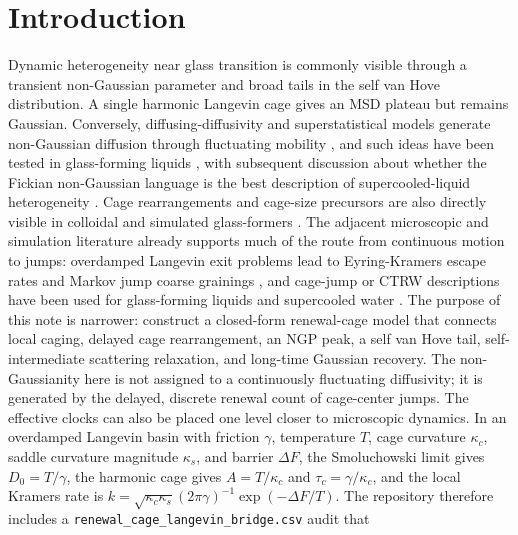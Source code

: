 \documentclass[aps,preprint,onecolumn,superscriptaddress,nofootinbib]{revtex4-2}
\begin{document}
\maketitle

\section{Introduction}

Dynamic heterogeneity near glass transition is commonly visible through a
transient non-Gaussian parameter and broad tails in the self van Hove
distribution. A single harmonic Langevin cage gives an MSD plateau but remains
Gaussian. Conversely, diffusing-diffusivity and superstatistical models
generate non-Gaussian diffusion through fluctuating mobility
\cite{chubynsky2014diffusing,chechkin2017brownian,guan2014fickian}, and such
ideas have been tested in glass-forming liquids \cite{rusciano2022fickian},
with subsequent discussion about whether the Fickian non-Gaussian language is
the best description of supercooled-liquid heterogeneity
\cite{berthier2023comment,rusciano2022reply}. Cage rearrangements and
cage-size precursors are also directly visible in colloidal and simulated
glass-formers \cite{weeks2002cage,pastore2017cage}. The adjacent microscopic
and simulation literature already supports much of the route from continuous
motion to jumps: overdamped Langevin exit problems lead to Eyring-Kramers
escape rates and Markov jump coarse grainings \cite{lelievre2022eyring}, and
cage-jump or CTRW descriptions have been used for glass-forming liquids
\cite{pastore2016cagejump,pastore2017cage} and supercooled water
\cite{kikutsuji2019water}. The purpose of this note is narrower: construct a
closed-form renewal-cage model that connects local caging, delayed cage
rearrangement, an NGP peak, a self van Hove tail, self-intermediate scattering
relaxation, and long-time Gaussian recovery. The non-Gaussianity here is not
assigned to a continuously fluctuating diffusivity; it is generated by the
delayed, discrete renewal count of cage-center jumps.
The effective clocks can also be placed one level closer to microscopic
dynamics. In an overdamped Langevin basin with friction $\gamma$, temperature
$T$, cage curvature $\kappa_c$, saddle curvature magnitude $\kappa_s$, and
barrier $\Delta F$, the Smoluchowski limit gives
$D_0=T/\gamma$, the harmonic cage gives
$A=T/\kappa_c$ and $\tau_c=\gamma/\kappa_c$, and the local Kramers rate is
$k=\sqrt{\kappa_c\kappa_s}(2\pi\gamma)^{-1}\exp(-\Delta F/T)$. The repository
therefore includes a \texttt{renewal\_cage\_langevin\_bridge.csv} audit that
\end{document}
